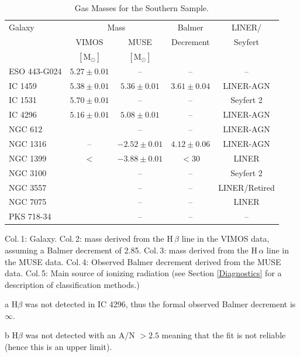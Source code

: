 		\begin{table}
			\centering
		\begin{threeparttable}
			\caption{Gas Masses for the Southern Sample.}
			\label{tab:gasMass}
			\begin{tabular}{l c c c c}
				\hline
				\hline
				Galaxy & \multicolumn{2}{c}{\ion{H}{ii} Mass} & Balmer & LINER/ \\
				& VIMOS & MUSE & Decrement & Seyfert \\
				& $[\mathrm{M_\odot}]$ & $[\mathrm{M_\odot}]$ & \\
				\hline
				ESO 443-G024 & $5.27 \pm 0.01$ 	& --  		& -- & -- \\
				IC 1459 	& $5.38 \pm 0.01$	& $5.36 \pm 0.01$ & $3.61 \pm 0.04$ & LINER-AGN\\
				IC 1531 	& $5.70 \pm 0.01$	& -- 		& -- & Seyfert 2\\
				IC 4296		& $5.16 \pm 0.01$	& $5.08 \pm 0.01$ & --\tnote{a} & LINER-AGN \\
				NGC 612 	&  		& -- 		& -- & LINER-AGN \\
				NGC 1316 	& -- 		& $-2.52 \pm 0.01$ & $4.12 \pm 0.06$ & LINER-AGN \\
				NGC 1399 	& $<$ 	& $-3.88 \pm 0.01$ & $<30$\tnote{b} & LINER \\
				NGC 3100 	&  		& -- 		& -- & Seyfert 2 \\
				NGC 3557 	&  		& -- 		& -- & LINER/Retired \\
				NGC 7075 	&  		& -- 		& -- & LINER \\
				PKS 718-34  &  		& -- 		& -- & -- \\
				\hline
				\hline
			\end{tabular}
			\begin{tablenotes}
			\footnotesize
			\note Col.\,1: Galaxy. Col.\,2:  mass derived from the H\,$\beta$ line in the VIMOS data, assuming a Balmer decrement of 2.85. Col.\,3:  mass derived from the H\,$\alpha$ line in the MUSE data. Col.\,4: Observed Balmer decrement derived from the MUSE data. Col.\,5: Main source of ionizing radiation (see Section \ref{Diagnostics} for a description of classification methods.)
			\item [a] H$\beta$ was not detected in IC 4296, thus the formal observed Balmer decrement is $\infty$. 
			\item [b] H$\beta$ was not detected with an A/N $> 2.5$ meaning that the fit is not reliable (hence this is an upper limit). 
			\end{tablenotes}
		\end{threeparttable}
		\end{table}
		

